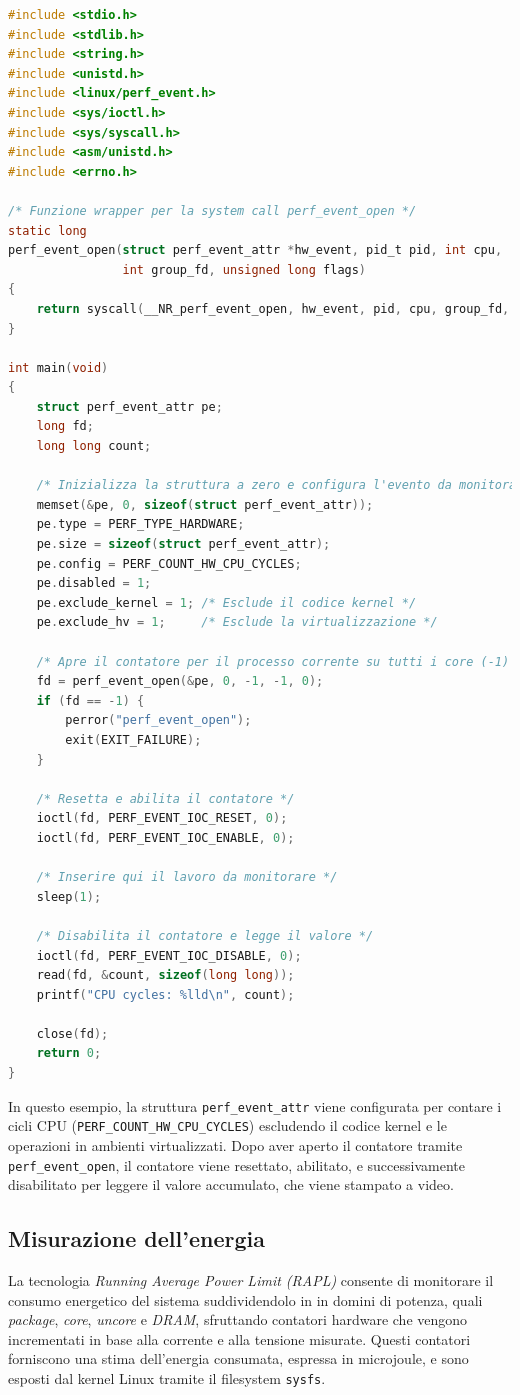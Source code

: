 \documentclass{article}
\begin{document}
\begin{lstlisting}[language=C, caption={Esempio di utilizzo di \texttt{perf\_event\_open} per contare i cicli CPU}]
#include <stdio.h>
#include <stdlib.h>
#include <string.h>
#include <unistd.h>
#include <linux/perf_event.h>
#include <sys/ioctl.h>
#include <sys/syscall.h>
#include <asm/unistd.h>
#include <errno.h>

/* Funzione wrapper per la system call perf_event_open */
static long
perf_event_open(struct perf_event_attr *hw_event, pid_t pid, int cpu,
                int group_fd, unsigned long flags)
{
    return syscall(__NR_perf_event_open, hw_event, pid, cpu, group_fd, flags);
}

int main(void)
{
    struct perf_event_attr pe;
    long fd;
    long long count;

    /* Inizializza la struttura a zero e configura l'evento da monitorare */
    memset(&pe, 0, sizeof(struct perf_event_attr));
    pe.type = PERF_TYPE_HARDWARE;
    pe.size = sizeof(struct perf_event_attr);
    pe.config = PERF_COUNT_HW_CPU_CYCLES;
    pe.disabled = 1;
    pe.exclude_kernel = 1; /* Esclude il codice kernel */
    pe.exclude_hv = 1;     /* Esclude la virtualizzazione */

    /* Apre il contatore per il processo corrente su tutti i core (-1) */
    fd = perf_event_open(&pe, 0, -1, -1, 0);
    if (fd == -1) {
        perror("perf_event_open");
        exit(EXIT_FAILURE);
    }

    /* Resetta e abilita il contatore */
    ioctl(fd, PERF_EVENT_IOC_RESET, 0);
    ioctl(fd, PERF_EVENT_IOC_ENABLE, 0);

    /* Inserire qui il lavoro da monitorare */
    sleep(1);

    /* Disabilita il contatore e legge il valore */
    ioctl(fd, PERF_EVENT_IOC_DISABLE, 0);
    read(fd, &count, sizeof(long long));
    printf("CPU cycles: %lld\n", count);

    close(fd);
    return 0;
}
\end{lstlisting}

In questo esempio, la struttura \texttt{perf\_event\_attr} viene configurata per contare i cicli CPU (\texttt{PERF\_COUNT\_HW\_CPU\_CYCLES}) escludendo il codice kernel e le operazioni in ambienti virtualizzati. Dopo aver aperto il contatore tramite \texttt{perf\_event\_open}, il contatore viene resettato, abilitato, e successivamente disabilitato per leggere il valore accumulato, che viene stampato a video.

\subsection{Misurazione dell'energia}
La tecnologia \emph{Running Average Power Limit (RAPL)} consente di monitorare il consumo energetico del sistema suddividendolo in in domini di potenza, quali \textit{package}, \textit{core}, \textit{uncore} e \textit{DRAM},  sfruttando contatori hardware che vengono incrementati in base alla corrente e alla tensione misurate. Questi contatori forniscono una stima dell'energia consumata, espressa in microjoule, e sono esposti dal kernel Linux tramite il filesystem \texttt{sysfs}.
\end{document}
